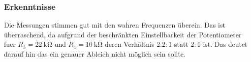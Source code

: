 \subsubsection{Erkenntnisse}
Die Messungen stimmen gut mit den wahren Frequenzen überein. Das
ist überraschend, da aufgrund der beschränkten Einstellbarkeit der
Potentiometer fuer $R_3=\SI{22}{\kilo\ohm}$ und $R_4=\SI{10}{\kilo\ohm}$ deren
Verhältnis $2.2:1$ statt $2:1$ ist. Das deutet darauf hin das ein genauer
Ableich nicht möglich sein sollte.

